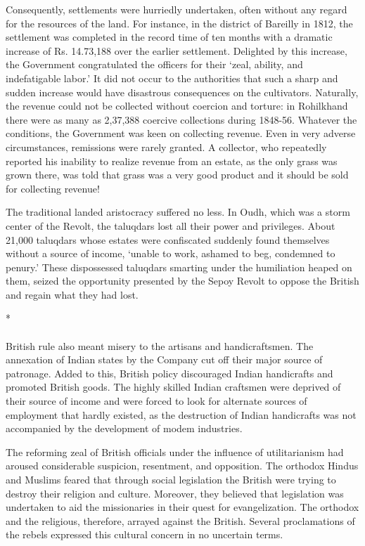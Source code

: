 Consequently, settlements were hurriedly undertaken, often without any regard for the resources of the land. For instance, in the district of Bareilly in 1812, the settlement was completed in the record time of ten months with a dramatic increase of Rs. 14.73,188 over the earlier settlement. Delighted by this increase, the Government congratulated the officers for their `zeal, ability, and indefatigable labor.' It did not occur to the authorities that such a sharp and sudden increase would have disastrous consequences on the cultivators. Naturally, the revenue could not be collected without coercion and torture: in Rohilkhand there were as many as 2,37,388 coercive collections during 1848-56. Whatever the conditions, the Government was keen on collecting revenue. Even in very adverse circumstances, remissions were rarely granted. A collector, who repeatedly reported his inability to realize revenue from an estate, as the only grass was grown there, was told that grass was a very good product and it should be sold for collecting revenue!

The traditional landed aristocracy suffered no less. In Oudh, which was a storm center of the Revolt, the taluqdars lost all their power and privileges. About 21,000 taluqdars whose estates were confiscated suddenly found themselves without a source of income, `unable to work, ashamed to beg, condemned to penury.' These dispossessed taluqdars smarting under the humiliation heaped on them, seized the opportunity presented by the Sepoy Revolt to oppose the British and regain what they had lost.

\begin{center}*\end{center}

\paragraph*{}
British rule also meant misery to the artisans and handicraftsmen. The annexation of Indian states by the Company cut off their major source of patronage. Added to this, British policy discouraged Indian handicrafts and promoted British goods. The highly skilled Indian craftsmen were deprived of their source of income and were forced to look for alternate sources of employment that hardly existed, as the destruction of Indian handicrafts was not accompanied by the development of modem industries.

The reforming zeal of British officials under the influence of utilitarianism had aroused considerable suspicion, resentment, and opposition. The orthodox Hindus and Muslims feared that through social legislation the British were trying to destroy their religion and culture. Moreover, they believed that legislation was undertaken to aid the missionaries in their quest for evangelization. The orthodox and the religious, therefore, arrayed against the British. Several proclamations of the rebels expressed this cultural concern in no uncertain terms.

